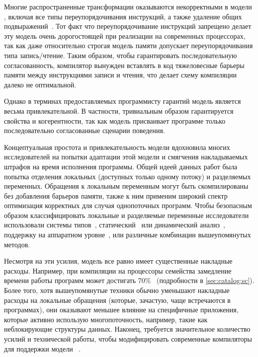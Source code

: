 Многие распространенные трансформации оказываются 
некорректными в модели \SC, включая 
все типы переупорядочивания инструкций, 
а также удаление общих подвыражений~\cite{Marino-al:PLDI11, Sevcik-Aspinall:ECOOP08}.
Тот факт что переупорядочивание инструкций запрещено 
делает эту модель очень дорогостоящей при реализации
на современных процессорах, так как даже 
относительно строгая модель памяти \Intel
допускает переупорядочивания типа запись/чтение. 
Таким образом, чтобы гарантировать последовательную согласованность, 
компилятор вынужден вставлять в код тяжеловесные 
барьеры памяти между инструкциями записи и чтения,
что делает схему компиляции далеко не оптимальной. 

Однако в терминах предоставляемых программисту гарантий 
модель \SC является весьма привлекательной. 
В частности, тривиальным образом гарантируется свойства \DRF и когерентности, 
так как модель присваивает программе только 
последовательно согласованные сценарии поведения. 

Концептуальная простота и привлекательность модели \SC 
вдохновила многих исследователей на попытки 
адаптации этой модели и смягчения накладываемых 
штрафов на время исполнения программы. 
Общей идеей данных работ была попытка 
отделения локальных (доступных только одному потоку) 
и разделяемых переменных.
Обращения к локальным переменным могут быть скомпилированы 
без добавления барьеров памяти, также к ним 
применим широкий спектр оптимизация корректных 
для случая однопоточных программ. 
Чтобы безопасным образом классифицировать 
локальные и разделяемые переменные исследователи 
использовали системы типов~\cite{Vollmer-al:PPoPP17},
статический~\cite{Singh-al:ISCA12} или динамический анализ~\cite{Liu-al:PLDI19}, 
поддержку на аппаратном уровне~\cite{Singh-al:ISCA12, Marino-al:PLDI10}, 
или различные комбинации вышеупомянутых методов.  

Несмотря на эти усилия, модель \SC все равно имеет существенные накладные расходы. 
Например, при компиляции на процессоры семейства 
замедление времени работы программ может достигать 70\%~\cite{Liu-al:PLDI19} 
(\see подробности в \cref{sec:catalog:sc}).
Более того, хотя вышеупомянутые техники обычно уменьшают 
накладные расходы на локальные обращения 
(которые, зачастую, чаще встречаются в программах),
они оказывают меньшее влияние на специфичные приложения, 
которые активно использую многопоточность, 
например, такие как неблокирующие структуры данных.
Наконец, требуется значительное количество усилий 
и технической работы, чтобы модифицировать 
современные компиляторы для поддержки модели \SC~\cite{Marino-al:PLDI11, Liu-al:PLDI19}.

